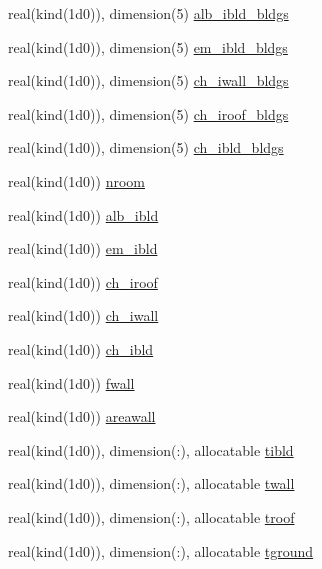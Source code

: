 \begin{DoxyCompactItemize}
\item 
real(kind(1d0)), dimension(5) \hyperlink{namespaceestm__data_a3663f0ff95c5090d9b5665e4bf5976e8}{alb\+\_\+ibld\+\_\+bldgs}
\item 
real(kind(1d0)), dimension(5) \hyperlink{namespaceestm__data_a0ae656fdc901e094138c7c01e556ab74}{em\+\_\+ibld\+\_\+bldgs}
\item 
real(kind(1d0)), dimension(5) \hyperlink{namespaceestm__data_a719d534316a73fc7012365ced77cfaa7}{ch\+\_\+iwall\+\_\+bldgs}
\item 
real(kind(1d0)), dimension(5) \hyperlink{namespaceestm__data_a7c4af2b5cebe1fd3c88b2c60f8064fd0}{ch\+\_\+iroof\+\_\+bldgs}
\item 
real(kind(1d0)), dimension(5) \hyperlink{namespaceestm__data_af2ac546e3106a586466309672adaf39d}{ch\+\_\+ibld\+\_\+bldgs}
\item 
real(kind(1d0)) \hyperlink{namespaceestm__data_a484d32bf82e9fbf6e99d5a867b09ebdf}{nroom}
\item 
real(kind(1d0)) \hyperlink{namespaceestm__data_a27342e25596431b642e42db136565905}{alb\+\_\+ibld}
\item 
real(kind(1d0)) \hyperlink{namespaceestm__data_aa8e01adad43973a11d6126e6c709092b}{em\+\_\+ibld}
\item 
real(kind(1d0)) \hyperlink{namespaceestm__data_aaad79d582a2d1bb00347adf79ad73de6}{ch\+\_\+iroof}
\item 
real(kind(1d0)) \hyperlink{namespaceestm__data_a3e846940895fc9898d7493ae053dae26}{ch\+\_\+iwall}
\item 
real(kind(1d0)) \hyperlink{namespaceestm__data_a9acac00707614f78bd70854d87bcc5de}{ch\+\_\+ibld}
\item 
real(kind(1d0)) \hyperlink{namespaceestm__data_a82d4728808abef718c63d66a77542383}{fwall}
\item 
real(kind(1d0)) \hyperlink{namespaceestm__data_a8537e873a1d20b585c3c9940de7645c7}{areawall}
\item 
real(kind(1d0)), dimension(\+:), allocatable \hyperlink{namespaceestm__data_ac5581091bba0f750cbe63327619693a5}{tibld}
\item 
real(kind(1d0)), dimension(\+:), allocatable \hyperlink{namespaceestm__data_a49312a4b669374fd5b4128e85f1d08b6}{twall}
\item 
real(kind(1d0)), dimension(\+:), allocatable \hyperlink{namespaceestm__data_a659039ba437449e2268beab9206c4bcf}{troof}
\item 
real(kind(1d0)), dimension(\+:), allocatable \hyperlink{namespaceestm__data_a31cf901029f7f3a0a3113c0e2dbd6d90}{tground}

\end{DoxyCompactItemize}
